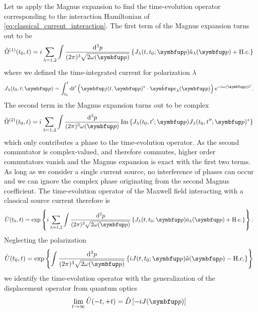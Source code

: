 Let us apply the Magnus expansion to find the time-evolution operator corresponding to the interaction Hamiltonian of \cref{eq:classical_current_interaction}.
The first term of the Magnus expansion turns out to be
\begin{equation}
	\hat{\Omega}^{(1)}(t_0,t)
	=
	i
	\sum_{\lambda=1,2}
	\int\frac{\dd[3]{p}}{(2\pi)^3\sqrt{2\omega(\vb{p})}}
	\left\{
		J_\lambda(t,t_0;\vb{p})
		\hat{a}_\lambda(\vb{p})
		+
		\text{H.c.}
	\right\}
\end{equation}
where we defined the time-integrated current for polarization $\lambda$
\begin{equation}
	J_\lambda(t_0,t;\vb{p})
	=
	\int_{t_0}^t\dd{t^\prime}
	\left(
		\vb{j}(t,\vb{p})^*
		\vdot
		\vu{e}_\lambda(\vb{p})
	\right)
	e^{-i\omega(\vb{p})t^\prime}
	.
\end{equation}
The second term in the Magnus expansion turns out to be complex
\begin{equation}
	\hat{\Omega}^{(2)}(t_0,t)
	=
	i\sum_{\lambda=1,2}
	\int\frac{\dd[3]{p}}{(2\pi)^3\omega(\vb{p})}
	\Im\left\{
		J_\lambda(t_0,t^\prime;\vb{p})
		J_\lambda(t_0,t^{\prime\prime};\vb{p})^*
	\right\}
\end{equation}
which only contributes a phase to the time-evolution operator.
As the second commutator is complex-valued, and therefore commutes, higher order commutators vanish and the Magnus expansion is exact with the first two terms.
As long as we consider a single current source, no interference of phases can occur and we can ignore the complex phase originating from the second Magnus coefficient.
The time-evolution operator of the Maxwell field interacting with a classical source current therefore is~\cite[p.~168]{Itzykson2012}
\begin{equation}
	\hat{U}(t_0,t)
	=
	\exp\left\{
		i\sum_{\lambda=1,2}
		\int\frac{\dd[3]{p}}{(2\pi) ^3\sqrt{2\omega(\vb{p})}}
		\left\{
			J_\lambda(t,t_0;\vb{p})
			\hat{a}_\lambda(\vb{p})
			+
			\text{H.c.}
		\right\}
	\right\}
	.
\end{equation}
Neglecting the polarization 
\begin{equation}
	\hat{U}(t_0,t)
	=
	\exp\left\{
		\int\frac{\dd[3]{p}}{(2\pi) ^3\sqrt{2\omega(\vb{p})}}
		\left\{
			i
			J(t,t_0;\vb{p})
			\hat{a}(\vb{p})
			-
			\text{H.c.}
		\right\}
	\right\}
\end{equation}
we identify the time-evolution operator with the generalization of the displacement operator from quantum optics~\cite[p.~47]{Barnett2002}
\begin{equation}
	\lim_{t\to\infty}\hat{U}(-t,+t)
	=
	\hat{D}\left[-iJ(\vb{p})\right]
\end{equation}

